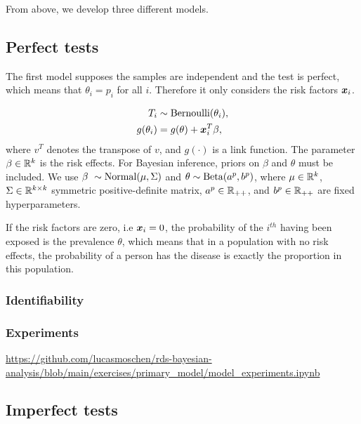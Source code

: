 From above, we develop three different models.

\subsection{Perfect tests}

The first model supposes the samples are independent and the test is perfect,
which means that $\theta_i = p_i$ for all $i$. Therefore it only considers the risk factors $\boldsymbol{x}_i$. 

\begin{equation}
  \begin{aligned}
    T_i &\sim \operatorname{Bernoulli}(\theta_i), \\
    g(\theta_i) &= g(\theta) + \boldsymbol{x}_i^T\beta, 
  \end{aligned}  
\end{equation}
where $v^T$ denotes the transpose of $v$, and $g(\cdot)$ is a link function.
The parameter $\beta \in \mathbb{R}^{k}$ is the risk effects. For Bayesian inference, priors on
$\beta$ and $\theta$ must be included. We use $\beta ~ \sim \operatorname{Normal}(\mu, \Sigma)$
and $\theta \sim \operatorname{Beta}(a^{p}, b^p)$, where $\mu
\in \mathbb{R}^{k}$, $\Sigma \in \mathbb{R}^{k\times k}$ symmetric positive-definite matrix,
$a^p \in \mathbb{R}_{++}$, and $b^p \in \mathbb{R}_{++}$
are fixed hyperparameters. 

\begin{remark}
  If the risk factors are zero, i.e $\boldsymbol{x}_i = 0$, the probability of the
  $i^{th}$ having been exposed is the prevalence $\theta$, which means that in
  a population with no risk effects, the probability of a person has the
  disease is exactly the proportion in this population. 
\end{remark}

\subsubsection{Identifiability}

\subsubsection{Experiments}

\url{https://github.com/lucasmoschen/rds-bayesian-analysis/blob/main/exercises/primary_model/model_experiments.ipynb}

\subsection{Imperfect tests}

